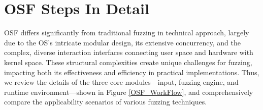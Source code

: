 
\section{OSF Steps In Detail} \label{Section4}

OSF differs significantly from traditional fuzzing in technical approach, largely due to the OS's intricate modular design, its extensive concurrency, and the complex, diverse interaction interfaces connecting user space and hardware with kernel space. These structural complexities create unique challenges for fuzzing, impacting both its effectiveness and efficiency in practical implementations. Thus, we review the details of the three core modules—input, fuzzing engine, and runtime environment—shown in Figure \ref{OSF_WorkFlow}, and comprehensively compare the applicability scenarios of various fuzzing techniques.



